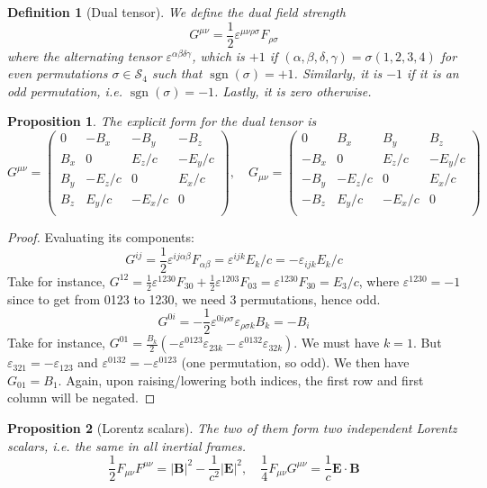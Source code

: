 \documentclass[a4paper]{article}
\DeclareMathOperator{\sgn}{sgn}
\theoremstyle{new}
\newtheorem{defi}{Definition}[section]
\newtheorem{prop}{Proposition}[section]
\begin{document}
\begin{defi}[Dual tensor]
We define the dual field strength
$$G^{\mu\nu}=\frac{1}{2}\varepsilon^{\mu\nu \rho\sigma}F_{\rho\sigma}$$
where the alternating tensor $\varepsilon^{\alpha\beta\delta\gamma}$, which is $+1$ if $(\alpha,\beta,\delta,\gamma)=\sigma(1,2,3,4)$ for even permutations $\sigma\in\mathcal{S}_4$ such that $\sgn(\sigma)=+1$. Similarly, it is $-1$ if it is an odd permutation, i.e. $\sgn(\sigma)=-1$. Lastly, it is zero otherwise.
\end{defi}
\begin{prop}
The explicit form for the dual tensor is
$$G^{\mu\nu}=\begin{pmatrix}0&-B_x&-B_y&-B_z\\B_x&0&E_z/c&-E_y/c\\B_y&-E_z/c&0&E_x/c\\B_z&E_y/c&-E_x/c&0\\\end{pmatrix},\quad G_{\mu\nu}=\begin{pmatrix}0&B_x&B_y&B_z\\-B_x&0&E_z/c&-E_y/c\\-B_y&-E_z/c&0&E_x/c\\-B_z&E_y/c&-E_x/c&0\\\end{pmatrix}$$
\end{prop}
\begin{proof}
Evaluating its components:
$$G^{ij}=\frac{1}{2}\varepsilon^{ij\alpha\beta}F_{\alpha\beta}=\varepsilon^{ijk}E_k/c=-\varepsilon_{ijk}E_k/c$$
Take for instance, $G^{12}=\frac{1}{2}\varepsilon^{1230}F_{30}+\frac{1}{2}\varepsilon^{1203}F_{03}=\varepsilon^{1230}F_{30}=E_3/c$, where $\varepsilon^{1230}=-1$ since to get from 0123 to 1230, we need 3 permutations, hence odd.
$$G^{0i}=-\frac{1}{2}\varepsilon^{0i\rho\sigma}\varepsilon_{\rho\sigma k}B_k=-B_i$$
Take for instance, $G^{01}=\frac{B_k}{2}(-\varepsilon^{0123}\varepsilon_{23k}-\varepsilon^{0132}\varepsilon_{32k})$. We must have $k=1$. But $\varepsilon_{321}=-\varepsilon_{123}$ and $\varepsilon^{0132}=-\varepsilon^{0123}$ (one permutation, so odd). We then have $G_{01}=B_1$. Again, upon raising/lowering both indices, the first row and first column will be negated.
\end{proof}
\begin{prop}[Lorentz scalars]
The two of them form two independent Lorentz scalars, i.e. the same in all inertial frames.
$$\frac{1}{2}F_{\mu\nu}F^{\mu\nu}=|\mathbf{B}|^2-\frac{1}{c^2}|\mathbf{E}|^2,\quad\frac{1}{4}F_{\mu\nu}G^{\mu\nu}=\frac{1}{c}\mathbf{E}\cdot\mathbf{B}$$
\end{prop}
\end{document}

